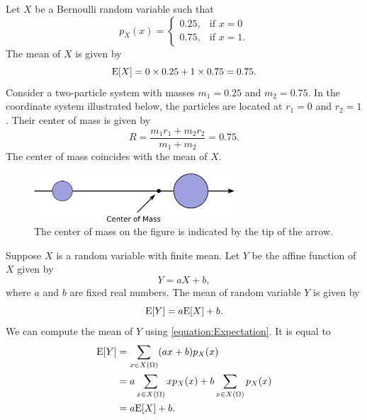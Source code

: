 \begin{example}
Let $X$ be a Bernoulli random variable such that
\begin{equation*}
p_X (x) = \left\{ \begin{array}{ll}
0.25, & \text{if }x = 0 \\
0.75, & \text{if }x = 1.
\end{array} \right.
\end{equation*}
The mean of $X$ is given by
\begin{equation*}
\mathrm{E} [X] = 0 \times 0.25 + 1 \times 0.75 = 0.75 .
\end{equation*}
Consider a two-particle system with masses $m_1 = 0.25$ and $m_2 = 0.75$.
In the coordinate system illustrated below, the particles are located at $r_1 = 0$ and $r_2 = 1$.
Their center of mass is given by
\begin{equation*}
R = \frac{ m_1 r_1 + m_2 r_2 }{ m_1 + m_2 } = 0.75 .
\end{equation*}
The center of mass coincides with the mean of $X$.

\begin{figure}[ht]
\begin{center}
\includegraphics[height=1.8cm]{Figures/5Chapter/mass}
\end{center}
\caption{The center of mass on the figure is indicated by the tip of the arrow.}
\end{figure}
\end{example}

Suppose $X$ is a random variable with finite mean.
Let $Y$ be the affine function of $X$ given by
\begin{equation*}
Y = aX + b,
\end{equation*}
where $a$ and $b$ are fixed real numbers.
The mean of random variable $Y$ is given by
\begin{equation*}
\mathrm{E} [Y] = a \mathrm{E} [X] + b.
\end{equation*}
We can compute the mean of $Y$ using \eqref{equation:Expectation}.
It is equal to
\begin{equation*}
\begin{split}
\mathrm{E} [Y] &= \sum_{x \in X(\Omega)} (ax + b) p_X(x) \\
&= a \sum_{x \in X(\Omega)} x p_X(x) + b \sum_{x \in X(\Omega)} p_X(x) \\
&= a \mathrm{E} [X] + b.
\end{split}
\end{equation*}

